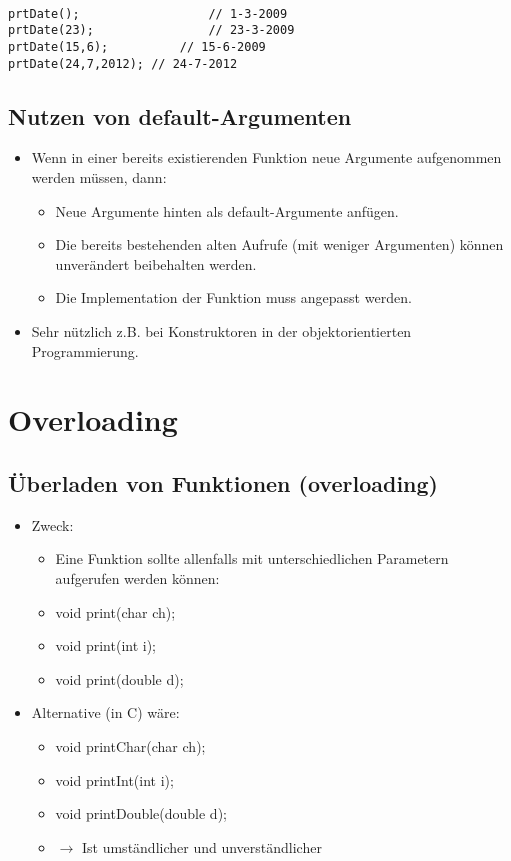 \\
\begin{minipage}{0.4\linewidth}
\begin{lstlisting}
prtDate();					// 1-3-2009
prtDate(23);				// 23-3-2009
prtDate(15,6);			// 15-6-2009
prtDate(24,7,2012);	// 24-7-2012
\end{lstlisting}
\end{minipage}

\subsection{Nutzen von default-Argumenten}
\begin{itemize}
	\item Wenn in einer bereits existierenden Funktion neue Argumente aufgenommen werden müssen, dann:
	\begin{itemize}
		\item Neue Argumente hinten als default-Argumente anfügen.
		\item Die bereits bestehenden alten Aufrufe (mit weniger Argumenten) können unverändert beibehalten werden.
		\item Die Implementation der Funktion muss angepasst werden.
	\end{itemize}
	\item Sehr nützlich z.B. bei Konstruktoren in der objektorientierten Programmierung.
\end{itemize}

\section{Overloading}
\label{sec:Overloading}

\subsection{Überladen von Funktionen (overloading)}
\begin{itemize}
	\item Zweck:
	\begin{itemize}
		\item[\-] Eine Funktion sollte allenfalls mit unterschiedlichen Parametern aufgerufen werden können:
		\item[\-] void print(char ch);
		\item[\-] void print(int i);
		\item[\-] void print(double d);
	\end{itemize}
	\item Alternative (in C) wäre:
	\begin{itemize}
		\item[\-] void printChar(char ch);
		\item[\-] void printInt(int i);
		\item[\-] void printDouble(double d);
		\item[\-] $\rightarrow$ Ist umständlicher und unverständlicher
 	\end{itemize}
\end{itemize}


